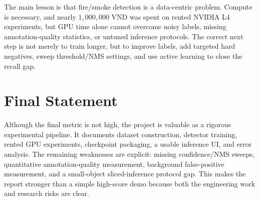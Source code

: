 \documentclass[12pt,a4paper]{report}
\begin{document}
The main lesson is that fire/smoke detection is a data-centric problem. Compute is necessary, and nearly \(1{,}000{,}000\) VND was spent on rented NVIDIA L4 experiments, but GPU time alone cannot overcome noisy labels, missing annotation-quality statistics, or untuned inference protocols. The correct next step is not merely to train longer, but to improve labels, add targeted hard negatives, sweep threshold/NMS settings, and use active learning to close the recall gap.

\section*{Final Statement}
Although the final metric is not high, the project is valuable as a rigorous experimental pipeline. It documents dataset construction, detector training, rented GPU experiments, checkpoint packaging, a usable inference UI, and error analysis. The remaining weaknesses are explicit: missing confidence/NMS sweeps, quantitative annotation-quality measurement, background false-positive measurement, and a small-object sliced-inference protocol gap. This makes the report stronger than a simple high-score demo because both the engineering work and research risks are clear.
\end{document}
